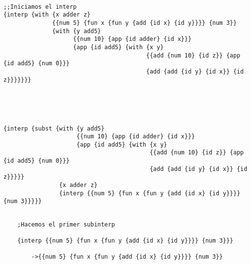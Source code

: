 \documentclass[a4paper]{article}
\begin{document}
\begin{verbatim}

;;Iniciamos el interp
{interp {with {x adder z}
              {{num 5} {fun x {fun y {add {id x} {id y}}}} {num 3}}
              {with {y add5}
                    {{num 10} {app {id adder} {id x}}}
                    {app {id add5} {with {x y}
                                         {{add {num 10} {id z}} {app {id add5} {num 0}}}
                                         {add {add {id y} {id x}} {id z}}}}}}}





{interp {subst {with {y add5}
                     {{num 10} {app {id adder} {id x}}}
                     {app {id add5} {with {x y}
                                          {{add {num 10} {id z}} {app {id add5} {num 0}}}
                                          {add {add {id y} {id x}} {id z}}}}}
                {x adder z}
                {interp {{num 5} {fun x {fun y {add {id x} {id y}}}} {num 3}}}}}

\end{verbatim}
\color{blue}
\begin{verbatim}

	;Hacemos el primer subinterp

    {interp {{num 5} {fun x {fun y {add {id x} {id y}}}} {num 3}}}
    
		->{{num 5} {fun x {fun y {add {id x} {id y}}}} {num 3}}
        
\end{verbatim}
\color{applegreen}
\end{document}
